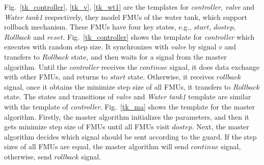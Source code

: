 \begin{figure}[htbp]
\end{figure}

Fig.~\ref{tk_controller}, \ref{tk_v}, \ref{tk_wt1} are the templates for \emph{controller}, \emph{valve} and \emph{Water tank1} respectively, they model FMUs of the water tank,  which support rollback mechanism. These FMUs have four key states, e.g., $start$, $dostep$, $Rollback$ and $reset$. Fig.~\ref{tk_controller} shows the template for \emph{controller} which executes with random step size. It synchronizes with \emph{valve} by signal $v$ and transfers to $Rollback$ state, and then waits for a signal from the master algorithm. Until the \emph{controller} receives the $continue$ signal, it does data exchange with other FMUs, and returns to $start$ state. Otherwise, it receives $rollback$ signal, once it obtains the minimize step size of all FMUs, it transfers to $Rollback$ state. The states and transitions of \emph{valve} and \emph{Water tank1} template are similar with the template of \emph{controller}. Fig.~\ref{tk_ma} shows the template for the master algorithm. Firstly, the master algorithm initializes the parameters, and then it gets minimize step size of FMUs until all FMUs visit $dostep$. Next, the master algorithm decides which signal should be sent according to the guard. If the step sizes of all FMUs are equal, the master algorithm will send $continue$ signal, otherwise, send $rollback$ signal.

